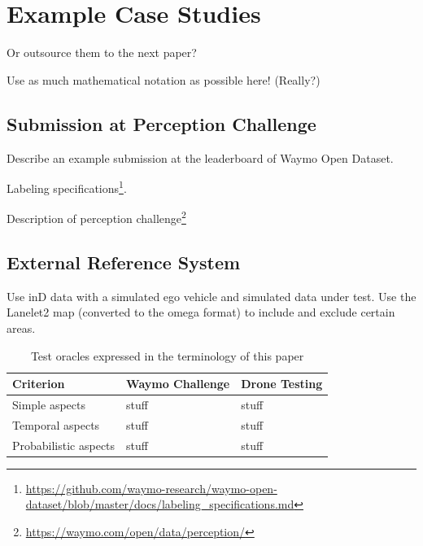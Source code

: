 \documentclass[conference]{IEEEtran}
\begin{document}


\section{Example Case Studies}

Or outsource them to the next paper?

Use as much mathematical notation as possible here! (Really?)

\subsection{Submission at Perception Challenge}
\label{sec:perception_challenge}

Describe an example submission at the leaderboard of Waymo Open Dataset. 

Labeling specifications\footnote{\url{https://github.com/waymo-research/waymo-open-dataset/blob/master/docs/labeling_specifications.md}}.

Description of perception challenge\footnote{\url{https://waymo.com/open/data/perception/}}


\subsection{External Reference System}

Use inD data with a simulated ego vehicle and simulated data under test.
Use the Lanelet2 map (converted to the omega format) to include and exclude certain areas.

\begin{table}[t]
	\centering
	\caption{Test oracles expressed in the terminology of this paper}
	\label{table:case_study}
	\begin{tabularx}{\linewidth}{
			>{\hsize=0.40\hsize}X 
			>{\hsize=0.8\hsize}X 
			>{\hsize=0.8\hsize}X 
		} 
		\toprule
		\textbf{Criterion} & \textbf{Waymo Challenge} & \textbf{Drone Testing} \\
		\midrule
		Simple aspects %
		& stuff
		& stuff \\
		\hline
		Temporal aspects 
		& stuff
		& stuff  \\ 
		\hline
		Probabilistic aspects 
		& stuff
		& stuff  \\ 
		\bottomrule
	\end{tabularx}
\end{table}
\end{document}
